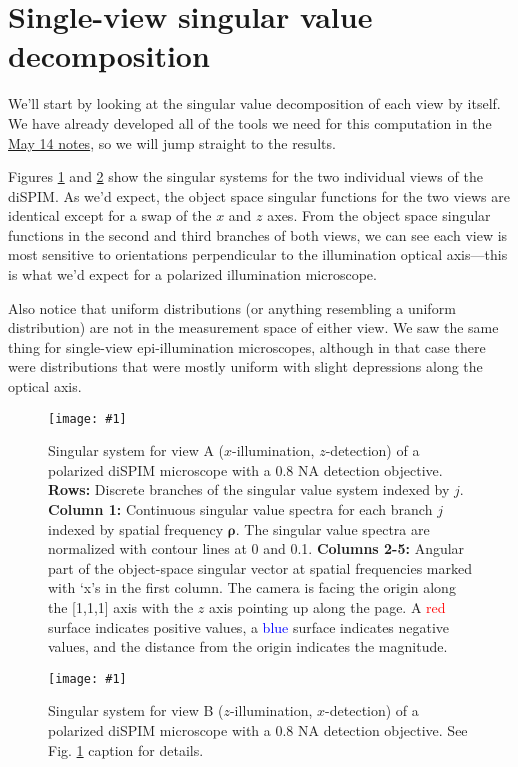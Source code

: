 \documentclass[11pt]{article}
\providecommand{\bs}[1]{\boldsymbol{#1}}
\providecommand{\fig}[4]{
\begin{figure}[h]
 \captionsetup{width=1.0\linewidth}
 \centering
 \texttt{[image: \#1]}
 \caption{#3}
 \label{fig:#4}
\end{figure}
}
\begin{document}
\section{Single-view singular value decomposition}
We'll start by looking at the singular value decomposition of each view by
itself. We have already developed all of the tools we need for this computation
in the
\href{https://github.com/talonchandler/polharmonic/blob/master/notes/2018-05-14-single-view-continuous-svd/report/report.pdf}{May
  14 notes}, so we will jump straight to the results.

Figures \ref{fig:sysA} and \ref{fig:sysB} show the singular systems for the two
individual views of the diSPIM. As we'd expect, the object space singular
functions for the two views are identical except for a swap of the $x$ and $z$
axes. From the object space singular functions in the second and third branches
of both views, we can see each view is most sensitive to orientations
perpendicular to the illumination optical axis---this is what we'd expect for a
polarized illumination microscope.

Also notice that uniform distributions (or anything resembling a uniform
distribution) are not in the measurement space of either view. We saw the same
thing for single-view epi-illumination microscopes, although in that case there
were distributions that were mostly uniform with slight depressions along the
optical axis.

\fig{../calculations/out/SVSx.pdf}{1.0}{Singular system for view A
  ($x$-illumination, $z$-detection) of a polarized diSPIM microscope with a 0.8
  NA detection objective. \textbf{Rows:} Discrete branches of the singular value
  system indexed by $j$. \textbf{Column 1:} Continuous singular value spectra
  for each branch $j$ indexed by spatial frequency $\bs{\rho}$. The singular
  value spectra are normalized with contour lines at 0 and 0.1. \textbf{Columns
    2-5:} Angular part of the object-space singular vector at spatial
  frequencies marked with `x's in the first column. The camera is facing the
  origin along the [1,1,1] axis with the $z$ axis pointing up along the page. A
  \textcolor{red}{red} surface indicates positive values, a
  \textcolor{blue}{blue} surface indicates negative values, and the distance
  from the origin indicates the magnitude.}{sysA}

\fig{../calculations/out/SVSz.pdf}{1.0}{Singular system for view B
  ($z$-illumination, $x$-detection) of a polarized diSPIM microscope with a 0.8
  NA detection objective. See Fig. \ref{fig:sysA} caption for details. }{sysB}
\end{document}
